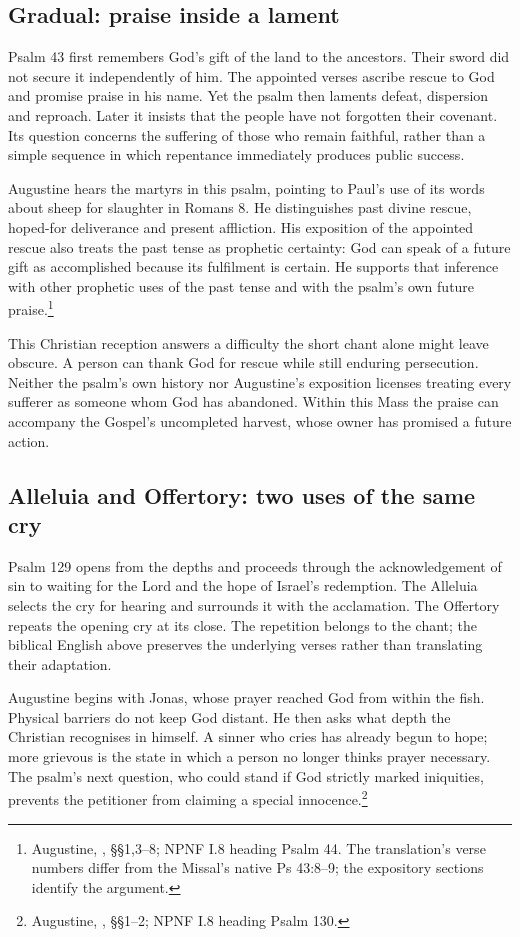\subsection{Gradual: praise inside a lament}
Psalm 43 first remembers God's gift of the land to the ancestors. Their
sword did not secure it independently of him. The appointed verses
ascribe rescue to God and promise praise in his name. Yet the psalm then
laments defeat, dispersion and reproach. Later it insists that the people
have not forgotten their covenant. Its question concerns the suffering
of those who remain faithful, rather than a simple sequence in which
repentance immediately produces public success.

Augustine hears the martyrs in this psalm, pointing to Paul's use of its
words about sheep for slaughter in Romans 8. He distinguishes past divine
rescue, hoped-for deliverance and present affliction. His exposition of
the appointed rescue also treats the past tense as prophetic certainty:
God can speak of a future gift as accomplished because its fulfilment is
certain. He supports that inference with other prophetic uses of the past
tense and with the psalm's own future praise.\footnote{Augustine,
, §§1,3--8; NPNF I.8 heading Psalm 44.
The translation's verse numbers differ from the Missal's native Ps 43:8--9;
the expository sections identify the argument.}

This Christian reception answers a difficulty the short chant alone
might leave obscure. A person can thank God for rescue while still
enduring persecution. Neither the psalm's own history nor Augustine's
exposition licenses treating every sufferer as someone whom God has
abandoned. Within this Mass the praise can accompany the Gospel's
uncompleted harvest, whose owner has promised a future action.

\subsection{Alleluia and Offertory: two uses of the same cry}
Psalm 129 opens from the depths and proceeds through the acknowledgement
of sin to waiting for the Lord and the hope of Israel's redemption.
The Alleluia selects the cry for hearing and surrounds it with the
acclamation. The Offertory repeats the opening cry at its close.
The repetition belongs to the chant; the biblical English above preserves
the underlying verses rather than translating their adaptation.

Augustine begins with Jonas, whose prayer reached God from within the
fish. Physical barriers do not keep God distant. He then asks what depth
the Christian recognises in himself. A sinner who cries has already begun
to hope; more grievous is the state in which a person no longer thinks
prayer necessary. The psalm's next question, who could stand if God
strictly marked iniquities, prevents the petitioner from claiming a
special innocence.\footnote{Augustine, ,
§§1--2; NPNF I.8 heading Psalm 130.}

